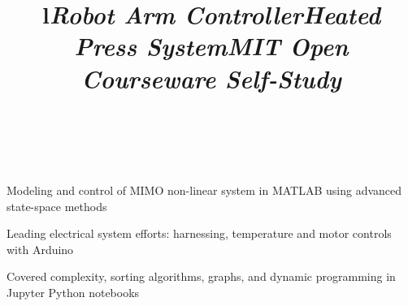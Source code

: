 \documentclass[mm]{res}
\begin{document}
\begin{resume}
\toprule

\section{\headingprojects}
\begin{format}
\title{l}\\
\body\\
\end{format}


\title{\textsl{Robot Arm Controller}}
\begin{position}
\tb Modeling and control of MIMO non-linear system in MATLAB using advanced state-space methods
\end{position}

\title{\textsl{Heated Press System}}
\begin{position}
\tb Leading electrical system efforts: harnessing, temperature and motor controls with Arduino
\end{position}




\title{\textsl{MIT Open Courseware Self-Study}}
\begin{position}
\tb Covered complexity, sorting algorithms, graphs, and dynamic programming in Jupyter Python notebooks
\end{position}


\end{resume}
\end{document}
